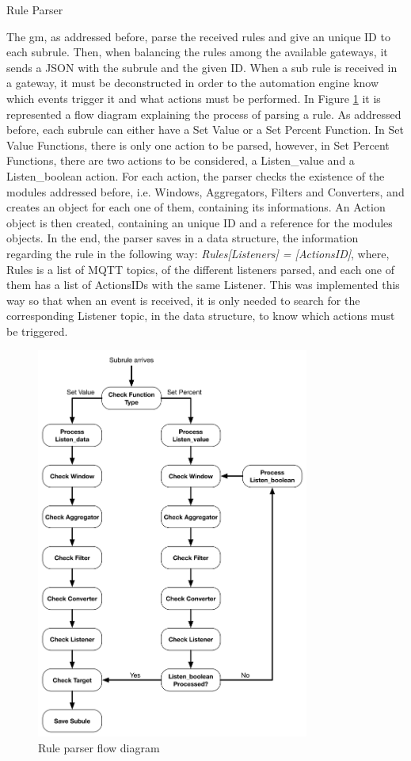 \begin{Paragraph}{Rule Parser}

The \ac{gm}, as addressed before, parse the received rules and give an unique ID to each subrule. Then, when balancing the rules among the available gateways, it sends a JSON with the subrule and the given ID. When a sub rule is received in a gateway, it must be deconstructed in order to the automation engine know which events trigger it and what actions must be performed. In Figure \ref{fig:parse} it is represented a flow diagram explaining the process of parsing a rule. As addressed before, each subrule can either have a Set Value or a Set Percent Function. In Set Value Functions, there is only one action to be parsed, however, in Set Percent Functions, there are two actions to be considered, a Listen\_value and a Listen\_boolean action. For each action, the parser checks the existence of the modules addressed before, i.e. Windows, Aggregators, Filters and Converters, and creates an object for each one of them, containing its informations. An Action object is then created, containing an unique ID and a reference for the modules objects. In the end, the parser saves in a data structure, the information regarding the rule in the following way: \textit{Rules[Listeners] = [ActionsID]}, where, Rules is a list of MQTT topics, of the different listeners parsed, and each one of them has a list of ActionsIDs with the same Listener. This was implemented this way so that when an event is received, it is only needed to search for the corresponding Listener topic, in the data structure, to know which actions must be triggered. 


\begin{figure}[H]
	\centering
	\includegraphics[width=0.8\textwidth]{figures/parseRule.png}
	\caption{Rule parser flow diagram}
	\label{fig:parse}
\end{figure}


\end{Paragraph}
